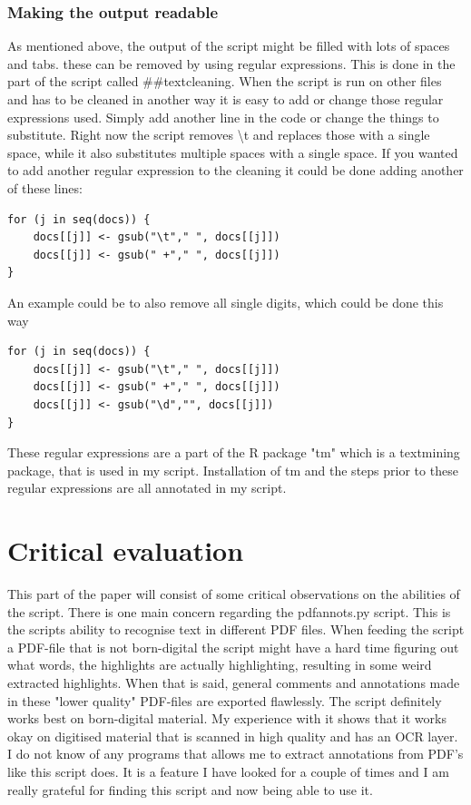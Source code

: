 \documentclass{article}
\begin{document}
\subsubsection{Making the output readable}
As mentioned above, the output of the script might be filled with lots of spaces and tabs. these can be removed by using regular expressions. This is done in the part of the script called ##textcleaning. When the script is run on other files and has to be cleaned in another way it is easy to add or change those regular expressions used. Simply add another line in the code or change the things to substitute. Right now the script removes \textbackslash t and replaces those with a single space, while it also substitutes multiple spaces with a single space. If you wanted to add another regular expression to the cleaning it could be done adding another of these lines:
\begin{verbatim}
for (j in seq(docs)) {
    docs[[j]] <- gsub("\t"," ", docs[[j]]) 
    docs[[j]] <- gsub(" +"," ", docs[[j]])
}
\end{verbatim}
An example could be to also remove all single digits, which could be done this way
\begin{verbatim}
for (j in seq(docs)) {
    docs[[j]] <- gsub("\t"," ", docs[[j]]) 
    docs[[j]] <- gsub(" +"," ", docs[[j]])
    docs[[j]] <- gsub("\d","", docs[[j]])
} 
\end{verbatim}
These regular expressions are a part of the R package "tm" which is a textmining package, that is used in my script. Installation of tm and the steps prior to these regular expressions are all annotated in my script. 

\section{Critical evaluation}
This part of the paper will consist of some critical observations on the abilities of the script. There is one main concern regarding the pdfannots.py script. This is the scripts ability to recognise text in different PDF files. When feeding the script a PDF-file that is not born-digital the script might have a hard time figuring out what words, the highlights are actually highlighting, resulting in some weird extracted highlights. When that is said, general comments and annotations made in these "lower quality" PDF-files are exported flawlessly. The script definitely works best on born-digital material. My experience with it shows that it works okay on digitised material that is scanned in high quality and has an OCR layer.\newline
I do not know of any programs that allows me to extract annotations from PDF's like this script does. It is a feature I have looked for a couple of times and I am really grateful for finding this script and now being able to use it.
\end{document}
